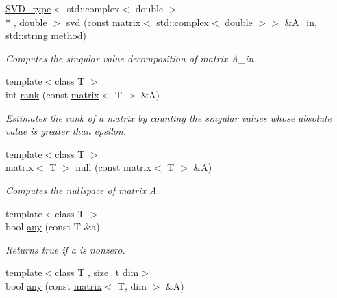 \begin{DoxyCompactItemize}
\item 
\hypertarget{namespacekeycpp_ad610adca37ac4c85df23b899d29d5dfc}{\hyperlink{classkeycpp_1_1_s_v_d__type}{S\-V\-D\-\_\-type}$<$ std\-::complex$<$ double $>$\\*
, double $>$ \hyperlink{namespacekeycpp_ad610adca37ac4c85df23b899d29d5dfc}{svd} (const \hyperlink{classkeycpp_1_1matrix}{matrix}$<$ std\-::complex$<$ double $>$$>$ \&A\-\_\-in, std\-::string method)}\label{namespacekeycpp_ad610adca37ac4c85df23b899d29d5dfc}

\begin{DoxyCompactList}\small\item\em Computes the singular value decomposition of matrix A\-\_\-in. \end{DoxyCompactList}\item 
\hypertarget{namespacekeycpp_aeb9efbc77cc58fa22403ea7ae5f4555c}{{\footnotesize template$<$class T $>$ }\\int \hyperlink{namespacekeycpp_aeb9efbc77cc58fa22403ea7ae5f4555c}{rank} (const \hyperlink{classkeycpp_1_1matrix}{matrix}$<$ T $>$ \&A)}\label{namespacekeycpp_aeb9efbc77cc58fa22403ea7ae5f4555c}

\begin{DoxyCompactList}\small\item\em Estimates the rank of a matrix by counting the singular values whose absolute value is greater than epsilon. \end{DoxyCompactList}\item 
\hypertarget{namespacekeycpp_a8f497e2da901adba0e1257be943595a1}{{\footnotesize template$<$class T $>$ }\\\hyperlink{classkeycpp_1_1matrix}{matrix}$<$ T $>$ \hyperlink{namespacekeycpp_a8f497e2da901adba0e1257be943595a1}{null} (const \hyperlink{classkeycpp_1_1matrix}{matrix}$<$ T $>$ \&A)}\label{namespacekeycpp_a8f497e2da901adba0e1257be943595a1}

\begin{DoxyCompactList}\small\item\em Computes the nullspace of matrix A. \end{DoxyCompactList}\item 
\hypertarget{namespacekeycpp_a70b89ab3e8f66f86c47c3bde004d4487}{{\footnotesize template$<$class T $>$ }\\bool \hyperlink{namespacekeycpp_a70b89ab3e8f66f86c47c3bde004d4487}{any} (const T \&a)}\label{namespacekeycpp_a70b89ab3e8f66f86c47c3bde004d4487}

\begin{DoxyCompactList}\small\item\em Returns true if a is nonzero. \end{DoxyCompactList}\item 
\hypertarget{namespacekeycpp_a7c36622975d56232740753ada20b9f86}{{\footnotesize template$<$class T , size\-\_\-t dim$>$ }\\bool \hyperlink{namespacekeycpp_a7c36622975d56232740753ada20b9f86}{any} (const \hyperlink{classkeycpp_1_1matrix}{matrix}$<$ T, dim $>$ \&A)}\label{namespacekeycpp_a7c36622975d56232740753ada20b9f86}


\end{DoxyCompactItemize}

